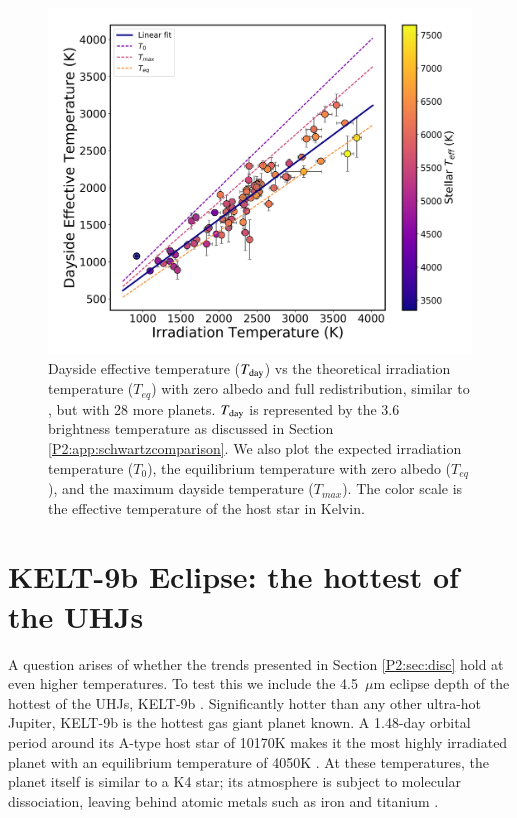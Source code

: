 \begin{subappendices}
\begin{figure}
    \centering
    \includegraphics[trim={0.5cm 0cm 0.5cm 0cm},clip,width=\linewidth]{Tb36_PHOENIX_intplvsT0_PHOENIX_intpl.pdf}
    \caption{Dayside effective temperature ($T_{\rm day}$) vs the theoretical irradiation temperature ($T_{eq}$) with zero albedo and full redistribution, similar to \citet{Schwartz2015}, but with 28 more planets. $T_{\rm day}$ is represented by the 3.6~\um~ brightness temperature as discussed in Section \ref{P2:app:schwartzcomparison}. We also plot the expected irradiation temperature ($T_0$), the equilibrium temperature with zero albedo ($T_{eq}$), and the maximum dayside temperature ($T_{max}$). The color scale is the effective temperature of the host star in Kelvin.}
    \label{P2:fig:Td}
\end{figure}

\section{KELT-9b Eclipse: the hottest of the UHJs}
\label{P2:app:kelt9b}

A question arises of  whether  the trends presented  in Section \ref{P2:sec:disc} hold at even higher temperatures. To test this we include the 4.5~$\mu$m eclipse depth of the hottest of the UHJs, KELT-9b \citep{Gaudi2017}. Significantly hotter than any other ultra-hot Jupiter, KELT-9b is the hottest gas giant planet known. A 1.48-day orbital period around its A-type host star of 10170K makes it the most highly irradiated planet with an equilibrium temperature of 4050K \citep{Gaudi2017}. At these temperatures, the planet itself is similar to a K4 star;  its atmosphere is subject to molecular dissociation, leaving behind atomic metals such as iron and titanium \citep{Hoeijmakers2018, Hoeijmakers2019}.


\end{subappendices}
